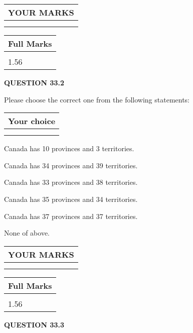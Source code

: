 \documentclass[12pt]{article}
\begin{document}
   
  
\vspace{0.2in}
  
\noindent\begin{tabular}{|l|}
\hline
 YOUR MARKS  \\
\hline
 \\ 
 \\ 
\hline
\end{tabular}
\hspace{0.05in} \begin{tabular}{|l|}
\hline
 Full Marks  \\
\hline
 \\ 
1.56 \\
\hline
\end{tabular}
{\textbf{\Large{QUESTION
33.2 
}}}
  
  
Please choose the correct one from the following statements:
  
  
\noindent\hspace{3.0in} \begin{tabular}{|l|}
\hline
Your choice \\
\hline
 \\ 
 \\ 
\hline
\end{tabular}
  
  
 
 
Canada has  %
10 provinces and  %
3 territories.
 
 
Canada has  %
34 provinces and  %
39 territories.
 
 
Canada has  %
33 provinces and  %
38 territories.
 
 
Canada has  %
35 provinces and  %
34 territories.
 
 
Canada has  %
37 provinces and  %
37 territories.
 
 
 None of above.
 
 
  
\vspace{0.2in}
  
\noindent\begin{tabular}{|l|}
\hline
 YOUR MARKS  \\
\hline
 \\ 
 \\ 
\hline
\end{tabular}
\hspace{0.05in} \begin{tabular}{|l|}
\hline
 Full Marks  \\
\hline
 \\ 
1.56 \\
\hline
\end{tabular}
{\textbf{\Large{QUESTION
33.3 
}}}
  
\end{document}
